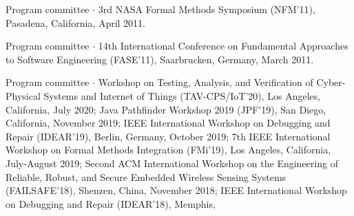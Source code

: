 \documentclass[ComputerScience]{vita}
\begin{document}
\begin{vita}
\begin{Panel and Committee Service}
\item Program committee $\cdot$ 3rd NASA Formal Methods Symposium (NFM'11), Pasadena, California, April 2011. 
\item Program committee $\cdot$ 14th International Conference on Fundamental Approaches to Software Engineering (FASE'11), Saarbrucken, Germany, March 2011.
\item Program committee $\cdot$  Workshop on Testing, Analysis, and Verification of Cyber-Physical Systems and Internet of Things (TAV-CPS/IoT'20), Los Angeles, California, July 2020; 
Java Pathfinder Workshop 2019 (JPF'19), San Diego, California,
November 2019; IEEE
  International Workshop on Debugging and Repair (IDEAR'19), Berlin,
  Germany, October 2019; 
7th IEEE International Workshop on
  Formal Methods Integration (FMi'19), Los Angeles, California,
  July-August 2019; 
  Second ACM International Workshop on
  the Engineering of Reliable, Robust, and Secure Embedded Wireless
  Sensing Systems (FAILSAFE'18), Shenzen, China, November 2018; IEEE
  International Workshop on Debugging and Repair (IDEAR'18), Memphis,

\end{Panel and Committee Service}
\end{vita}
\end{document}
